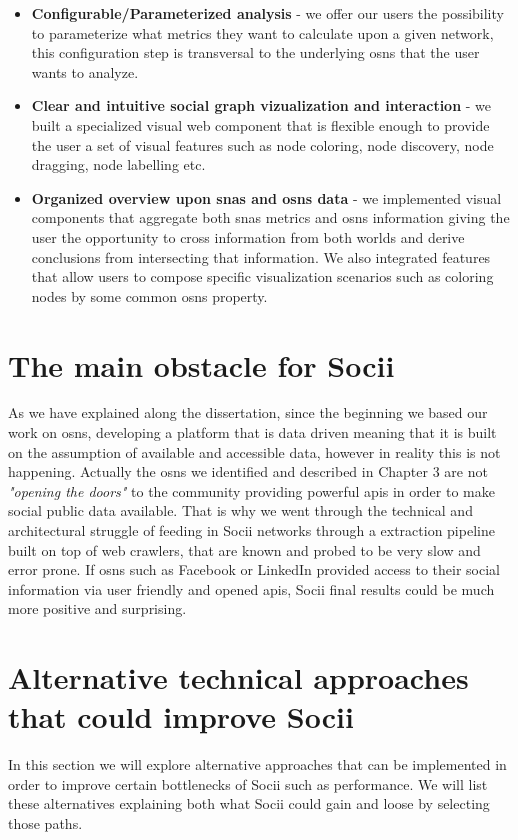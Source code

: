 \begin{itemize}
    \item \textbf{Configurable/Parameterized analysis} - we offer our users the possibility to parameterize what metrics they want to calculate upon a given network, this configuration step is transversal to the underlying \glspl{osn} that the user wants to analyze.
    \item \textbf{Clear and intuitive social graph vizualization and interaction} - we built a specialized visual web component that is flexible enough to provide the user a set of visual features such as node coloring, node discovery, node dragging, node labelling etc.
    \item \textbf{Organized overview upon \glspl{sna} and \glspl{osn} data} - we implemented visual components that aggregate both \glspl{sna} metrics and \glspl{osn} information giving the user the opportunity to cross information from both worlds and derive conclusions from intersecting that information. We also integrated features that allow users to compose specific visualization scenarios such as coloring nodes by some common \glspl{osn} property.
\end{itemize}

\section{The main obstacle for Socii}
As we have explained along the dissertation, since the beginning we based our work on \glspl{osn}, developing a platform that is data driven meaning that it is built on the assumption of available and accessible data, however in reality this is not happening. Actually the \glspl{osn} we identified and described in Chapter 3 are not \textit{"opening the doors"} to the community providing powerful \glspl{api} in order to make social public data available. That is why we went through the technical and architectural struggle of feeding in Socii networks through a extraction pipeline built on top of web crawlers, that are known and probed to be very slow and error prone. If \glspl{osn} such as Facebook or LinkedIn provided access to their social information via user friendly and opened \glspl{api}, Socii final results could be much more positive and surprising.

\section{Alternative technical approaches that could improve Socii}
In this section we will explore alternative approaches that can be implemented in order to improve certain bottlenecks of Socii such as performance. We will list these alternatives explaining both what Socii could gain and loose by selecting those paths.

